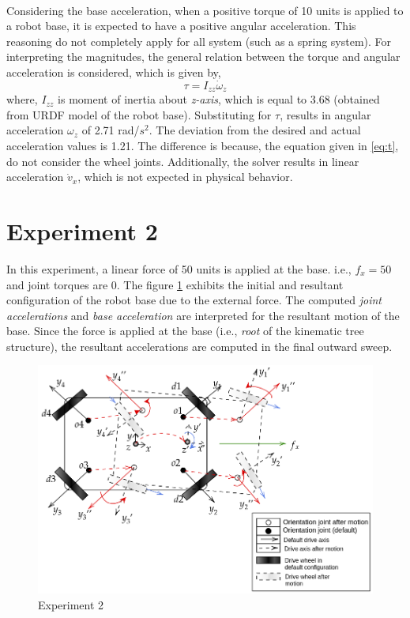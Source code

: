 \paragraph{}Considering the base acceleration, when a positive torque of 10 units is applied to a robot base, it is expected to have a positive angular acceleration. This reasoning do not completely apply for all system (such as a spring system). For interpreting the magnitudes, the general relation between the torque and angular acceleration is considered, which is given by,
\begin{equation}\label{eq:t}
	\tau = I_{zz} \dot{\omega}_z
\end{equation}
where, $I_{zz}$ is moment of inertia about \textit{z-axis}, which is equal to 3.68 (obtained from URDF model of the robot base). Substituting for $\tau$, results in angular acceleration $\omega_z$ of 2.71 rad/$s^2$. The deviation from the desired and actual acceleration values is 1.21. The difference is because, the equation given in \ref{eq:t}, do not consider the wheel joints. Additionally, the solver results in linear acceleration $\dot{v}_x$, which is not expected in physical behavior.  

\section{Experiment 2}
In this experiment, a linear force of 50 units is applied at the base. i.e., $f_x = 50$ and joint torques are 0. The figure \ref{fig:exp2} exhibits the initial and resultant configuration of the robot base due to the external force. The computed \textit{joint accelerations} and \textit{base acceleration} are interpreted for the resultant motion of the base. Since the force is applied at the base (i.e., \textit{root} of the kinematic tree structure), the resultant accelerations are computed in the final outward sweep.

\begin{figure}[h!]
	\begin{center}
		\includegraphics[scale=0.46]{images/exp2.png}
	\end{center}
	\caption{Experiment 2}
	\label{fig:exp2}
\end{figure}

